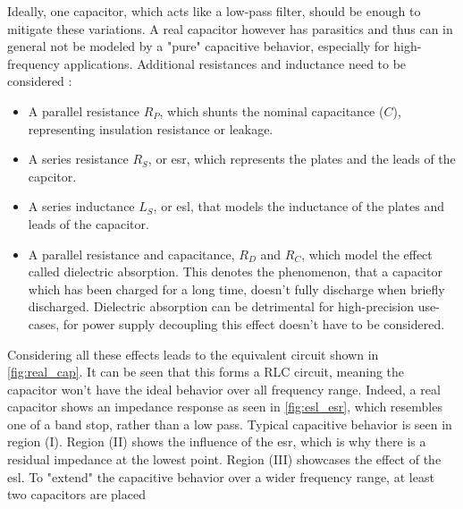 Ideally, one capacitor, which acts like a low-pass filter, should be enough to mitigate these variations. A real capacitor however has parasitics and thus can in general not be modeled by a "pure" capacitive behavior, especially for high-frequency applications. Additional resistances and inductance need to be considered \cite{decouple}:
\begin{itemize}
	\item A parallel resistance $R_P$, which shunts the nominal capacitance ($C$), representing insulation resistance or leakage.
	\item A series resistance $R_S$, or \gls{esr}, which represents the plates and the leads of the capcitor.
	\item A series inductance $L_S$, or \gls{esl}, that models the inductance of the plates and leads of the capacitor.
	\item A parallel resistance and capacitance, $R_D$ and $R_C$, which model the effect called dielectric absorption. This denotes the phenomenon, that a capacitor which has been charged for a long time, doesn't fully discharge when briefly discharged. Dielectric absorption can be detrimental for high-precision use-cases, for power supply decoupling this effect doesn't have to be considered.
\end{itemize}
Considering all these effects leads to the equivalent circuit shown in \autoref{fig:real_cap}. It can be seen that this forms a RLC circuit, meaning the capacitor won't have the ideal behavior over all frequency range. Indeed, a real capacitor shows an impedance response as seen in \autoref{fig:esl_esr}, which resembles one of a band stop, rather than a low pass. Typical capacitive behavior is seen in region (I). Region (II) shows the influence of the \gls{esr}, which is why there is a residual impedance at the lowest point. Region (III) showcases the effect of the \gls{esl}. 
To "extend" the capacitive behavior over a wider frequency range, at least two capacitors are placed 

